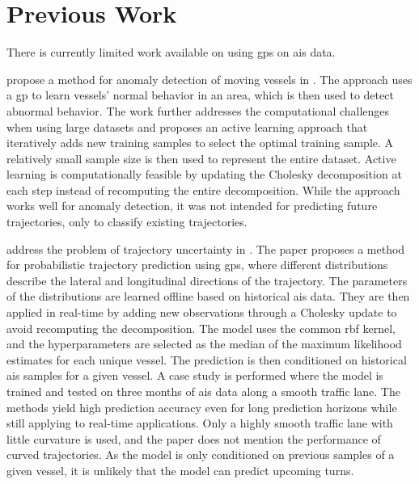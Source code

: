 \chapter{Previous Work}\label{chap:prior_work}

There is currently limited work available on using \acrshort{gp}s on \acrshort{ais} data.

\citeauthor{gpanomaly} propose a method for anomaly detection of moving vessels in \cite{gpanomaly}. The approach uses a \acrshort{gp} to learn vessels' normal behavior in an area, which is then used to detect abnormal behavior. The work further addresses the computational challenges when using large datasets and proposes an active learning approach that iteratively adds new training samples to select the optimal training sample. A relatively small sample size is then used to represent the entire dataset. Active learning is computationally feasible by updating the Cholesky decomposition at each step instead of recomputing the entire decomposition. While the approach works well for anomaly detection, it was not intended for predicting future trajectories, only to classify existing trajectories.

\citeauthor{gp_ais_trajectory} address the problem of trajectory uncertainty in \cite{gp_ais_trajectory}. The paper proposes a method for probabilistic trajectory prediction using \acrshort{gp}s, where different distributions describe the lateral and longitudinal directions of the trajectory. The parameters of the distributions are learned offline based on historical \acrshort{ais} data. They are then applied in real-time by adding new observations through a Cholesky update to avoid recomputing the decomposition. The model uses the common \acrshort{rbf} kernel, and the hyperparameters are selected as the median of the maximum likelihood estimates for each unique vessel. The prediction is then conditioned on historical \acrshort{ais} samples for a given vessel.
A case study is performed where the model is trained and tested on three months of \acrshort{ais} data along a smooth traffic lane. The methods yield high prediction accuracy even for long prediction horizons while still applying to real-time applications. Only a highly smooth traffic lane with little curvature is used, and the paper does not mention the performance of curved trajectories. As the model is only conditioned on previous samples of a given vessel, it is unlikely that the model can predict upcoming turns. 

